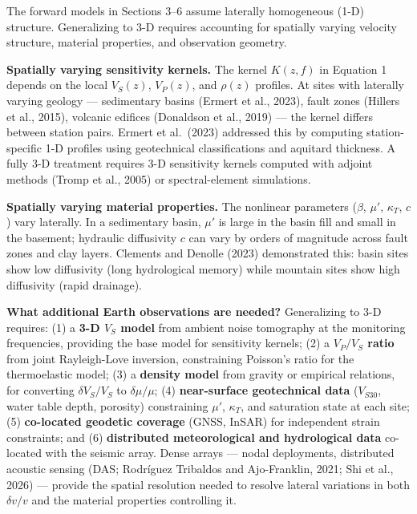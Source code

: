 \documentclass[draft]{agujournal2019}
\begin{document}
The forward models in Sections 3--6 assume laterally homogeneous (1-D)
structure. Generalizing to 3-D requires accounting for spatially varying
velocity structure, material properties, and observation geometry.

\textbf{Spatially varying sensitivity kernels.} The kernel \(K(z, f)\)
in Equation 1 depends on the local \(V_S(z)\), \(V_P(z)\), and
\(\rho(z)\) profiles. At sites with laterally varying geology ---
sedimentary basins (Ermert et al., 2023), fault zones (Hillers et al.,
2015), volcanic edifices (Donaldson et al., 2019) --- the kernel differs
between station pairs. Ermert et al.~(2023) addressed this by computing
station-specific 1-D profiles using geotechnical classifications and
aquitard thickness. A fully 3-D treatment requires 3-D sensitivity
kernels computed with adjoint methods (Tromp et al., 2005) or
spectral-element simulations.

\textbf{Spatially varying material properties.} The nonlinear parameters
(\(\beta\), \(\mu'\), \(\kappa_T\), \(c\)) vary laterally. In a
sedimentary basin, \(\mu'\) is large in the basin fill and small in the
basement; hydraulic diffusivity \(c\) can vary by orders of magnitude
across fault zones and clay layers. Clements and Denolle (2023)
demonstrated this: basin sites show low diffusivity (long hydrological
memory) while mountain sites show high diffusivity (rapid drainage).

\textbf{What additional Earth observations are needed?} Generalizing to
3-D requires: (1) a \textbf{3-D \(V_S\) model} from ambient noise
tomography at the monitoring frequencies, providing the base model for
sensitivity kernels; (2) a \textbf{\(V_P/V_S\) ratio} from joint
Rayleigh-Love inversion, constraining Poisson's ratio for the
thermoelastic model; (3) a \textbf{density model} from gravity or
empirical relations, for converting \(\delta V_S/V_S\) to
\(\delta\mu/\mu\); (4) \textbf{near-surface geotechnical data}
(\(V_{S30}\), water table depth, porosity) constraining \(\mu'\),
\(\kappa_T\), and saturation state at each site; (5) \textbf{co-located
geodetic coverage} (GNSS, InSAR) for independent strain constraints; and
(6) \textbf{distributed meteorological and hydrological data} co-located
with the seismic array. Dense arrays --- nodal deployments, distributed
acoustic sensing (DAS; Rodríguez Tribaldos and Ajo-Franklin, 2021; Shi
et al., 2026) --- provide the spatial resolution needed to resolve
lateral variations in both \(\delta v/v\) and the material properties
controlling it.
\end{document}
